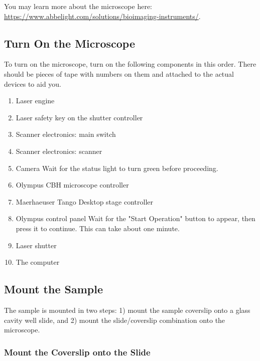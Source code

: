 \documentclass[10pt,a4paper,oneside]{book}
\begin{document}
You may learn more about the microscope here: \url{https://www.abbelight.com/solutions/bioimaging-instruments/}.

\subsection{Turn On the Microscope}\label{sec:startup}

To turn on the microscope, turn on the following components in this order. There should be pieces of tape with numbers on them and attached to the actual devices to aid you.

\begin{enumerate}
    \item Laser engine
    \item Laser safety key on the shutter controller
    \item Scanner electronics: main switch
    \item Scanner electronics: scanner
    \item Camera \newline Wait for the status light to turn green before proceeding.
    \item Olympus CBH microscope controller
    \item Maerhaeuser Tango Desktop stage controller
    \item Olympus control panel \newline Wait for the "Start Operation" button to appear, then press it to continue. This can take about one minute.
    \item Laser shutter
    \item The computer
\end{enumerate}

\subsection{Mount the Sample}

The sample is mounted in two steps: 1) mount the sample coverslip onto a glass cavity well slide, and 2) mount the slide/coverslip combination onto the microscope.

\subsubsection{Mount the Coverslip onto the Slide}

\newline
\end{document}

